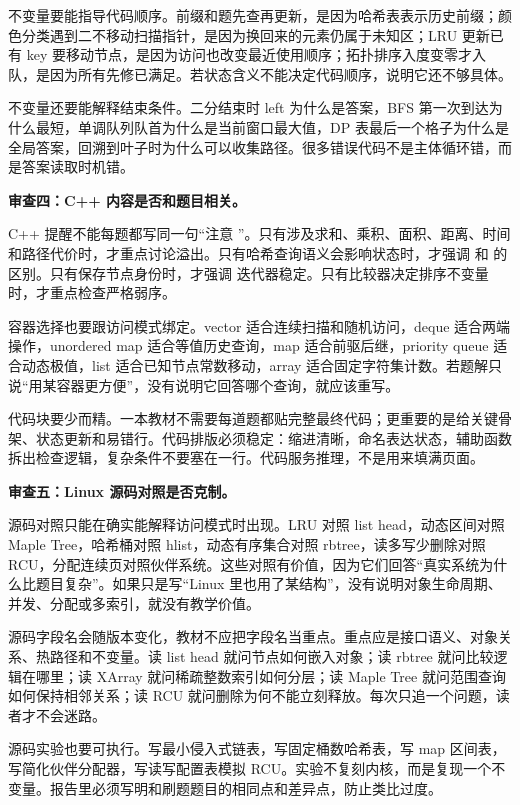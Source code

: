 不变量要能指导代码顺序。前缀和题先查再更新，是因为哈希表表示历史前缀；颜色分类遇到二不移动扫描指针，是因为换回来的元素仍属于未知区；LRU 更新已有 key 要移动节点，是因为访问也改变最近使用顺序；拓扑排序入度变零才入队，是因为所有先修已满足。若状态含义不能决定代码顺序，说明它还不够具体。

不变量还要能解释结束条件。二分结束时 left 为什么是答案，BFS 第一次到达为什么最短，单调队列队首为什么是当前窗口最大值，DP 表最后一个格子为什么是全局答案，回溯到叶子时为什么可以收集路径。很多错误代码不是主体循环错，而是答案读取时机错。

\noindent\textbf{审查四：C++ 内容是否和题目相关。}

C++ 提醒不能每题都写同一句“注意 ”。只有涉及求和、乘积、面积、距离、时间和路径代价时，才重点讨论溢出。只有哈希查询语义会影响状态时，才强调  和  的区别。只有保存节点身份时，才强调  迭代器稳定。只有比较器决定排序不变量时，才重点检查严格弱序。

容器选择也要跟访问模式绑定。vector 适合连续扫描和随机访问，deque 适合两端操作，unordered map 适合等值历史查询，map 适合前驱后继，priority queue 适合动态极值，list 适合已知节点常数移动，array 适合固定字符集计数。若题解只说“用某容器更方便”，没有说明它回答哪个查询，就应该重写。

代码块要少而精。一本教材不需要每道题都贴完整最终代码；更重要的是给关键骨架、状态更新和易错行。代码排版必须稳定：缩进清晰，命名表达状态，辅助函数拆出检查逻辑，复杂条件不要塞在一行。代码服务推理，不是用来填满页面。

\noindent\textbf{审查五：Linux 源码对照是否克制。}

源码对照只能在确实能解释访问模式时出现。LRU 对照 list head，动态区间对照 Maple Tree，哈希桶对照 hlist，动态有序集合对照 rbtree，读多写少删除对照 RCU，分配连续页对照伙伴系统。这些对照有价值，因为它们回答“真实系统为什么比题目复杂”。如果只是写“Linux 里也用了某结构”，没有说明对象生命周期、并发、分配或多索引，就没有教学价值。

源码字段名会随版本变化，教材不应把字段名当重点。重点应是接口语义、对象关系、热路径和不变量。读 list head 就问节点如何嵌入对象；读 rbtree 就问比较逻辑在哪里；读 XArray 就问稀疏整数索引如何分层；读 Maple Tree 就问范围查询如何保持相邻关系；读 RCU 就问删除为何不能立刻释放。每次只追一个问题，读者才不会迷路。

源码实验也要可执行。写最小侵入式链表，写固定桶数哈希表，写 map 区间表，写简化伙伴分配器，写读写配置表模拟 RCU。实验不复刻内核，而是复现一个不变量。报告里必须写明和刷题题目的相同点和差异点，防止类比过度。

